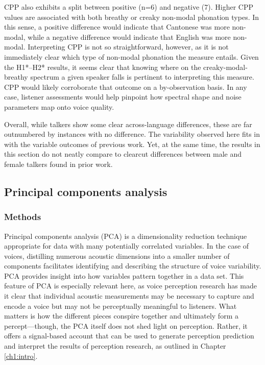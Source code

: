 CPP also exhibits a split between positive (n=6) and negative (7). Higher CPP values are associated with both breathy or creaky non-modal phonation types. In this sense, a positive difference would indicate that Cantonese was more non-modal, while a negative difference would indicate that English was more non-modal. Interpreting CPP is not so straightforward, however, as it is not immediately clear which type of non-modal phonation the measure entails. Given the H1*--H2* results, it seems clear that knowing where on the creaky-modal-breathy spectrum a given speaker falls is pertinent to interpreting this measure. CPP would likely corroborate that outcome on a by-observation basis. In any case, listener assessments would help pinpoint how spectral shape and noise parameters map onto voice quality.  

Overall, while talkers show some clear across-language differences, these are far outnumbered by instances with no difference. The variability observed here fits in with the variable outcomes of previous work. Yet, at the same time, the results in this section do not neatly compare to clearcut differences between male and female talkers found in prior work.

\subsection{Principal components analysis}\label{ch3:sec:pca}

\subsubsection{Methods}

Principal components analysis (PCA) is a dimensionality reduction technique appropriate for data with many potentially correlated variables. In the case of voices, distilling numerous acoustic dimensions into a smaller number of components facilitates identifying and describing the structure of voice variability. PCA provides insight into how variables pattern together in a data set. This feature of PCA is especially relevant here, as voice perception research has made it clear that individual acoustic measurements may be necessary to capture and encode a voice but may not be perceptually meaningful to listeners. What matters is how the different pieces conspire together and ultimately form a percept---though, the PCA itself does not shed light on perception. Rather, it offers a signal-based account that can be used to generate perception prediction and interpret the results of perception research, as outlined in Chapter \ref{ch1:intro}.

